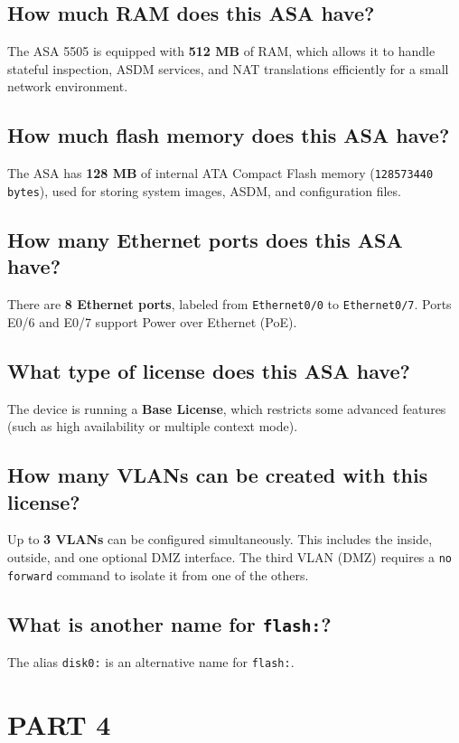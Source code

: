 \documentclass[a4paper,11pt]{article}
\begin{document}
\subsection*{How much RAM does this ASA have?}
The ASA 5505 is equipped with \textbf{512 MB} of RAM, which allows it to handle stateful inspection, ASDM services, and NAT translations efficiently for a small network environment.

\subsection*{How much flash memory does this ASA have?}
The ASA has \textbf{128 MB} of internal ATA Compact Flash memory (\texttt{128573440 bytes}), used for storing system images, ASDM, and configuration files.

\subsection*{How many Ethernet ports does this ASA have?}
There are \textbf{8 Ethernet ports}, labeled from \texttt{Ethernet0/0} to \texttt{Ethernet0/7}. Ports E0/6 and E0/7 support Power over Ethernet (PoE).

\subsection*{What type of license does this ASA have?}
The device is running a \textbf{Base License}, which restricts some advanced features (such as high availability or multiple context mode).

\subsection*{How many VLANs can be created with this license?}
Up to \textbf{3 VLANs} can be configured simultaneously. This includes the inside, outside, and one optional DMZ interface. The third VLAN (DMZ) requires a \texttt{no forward} command to isolate it from one of the others.

\subsection*{What is another name for \texttt{flash:}?}
The alias \texttt{disk0:} is an alternative name for \texttt{flash:}.

\section*{PART 4}
\end{document}
